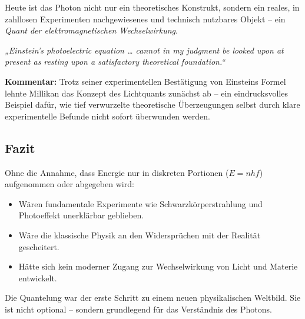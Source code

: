 Heute ist das Photon nicht nur ein theoretisches Konstrukt, sondern ein reales, in zahllosen Experimenten nachgewiesenes und technisch nutzbares Objekt – ein \emph{Quant der elektromagnetischen Wechselwirkung}.
\medskip
\begin{tcolorbox}[physikbox, title=Robert A. Millikan über Einstein (1916) \cite{millikan_1916}]
	\label{box:millikan-einstein}
	\emph{„Einstein’s photoelectric equation … cannot in my judgment be looked upon at present as resting upon a satisfactory theoretical foundation.“}
	
	\vspace{6pt}
	\textbf{Kommentar:} Trotz seiner experimentellen Bestätigung von Einsteins Formel lehnte Millikan das Konzept des Lichtquants zunächst ab – ein eindrucksvolles Beispiel dafür, wie tief verwurzelte theoretische Überzeugungen selbst durch klare experimentelle Befunde nicht sofort überwunden werden.
\end{tcolorbox}

\subsection{Fazit}
\medskip
\begin{tcolorbox}[hypobox, title={Was wäre, wenn nicht gequantelt wäre?}]
	\label{box:hypo-keine-quanten}
	Ohne die Annahme, dass Energie nur in diskreten Portionen ($E = nhf$) aufgenommen oder abgegeben wird:
	\begin{itemize}
		\item Wären fundamentale Experimente wie Schwarzkörperstrahlung und Photoeffekt unerklärbar geblieben.
		\item Wäre die klassische Physik an den Widersprüchen mit der Realität gescheitert.
		\item Hätte sich kein moderner Zugang zur Wechselwirkung von Licht und Materie entwickelt.
	\end{itemize}
	Die Quantelung war der erste Schritt zu einem neuen physikalischen Weltbild. Sie ist nicht optional – sondern grundlegend für das Verständnis des Photons.
\end{tcolorbox}

